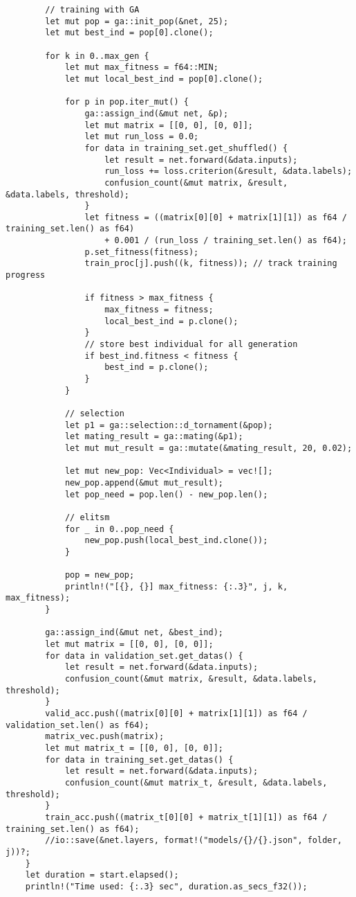 \begin{code}
\begin{verbatim}
        // training with GA
        let mut pop = ga::init_pop(&net, 25);
        let mut best_ind = pop[0].clone();

        for k in 0..max_gen {
            let mut max_fitness = f64::MIN;
            let mut local_best_ind = pop[0].clone();

            for p in pop.iter_mut() {
                ga::assign_ind(&mut net, &p);
                let mut matrix = [[0, 0], [0, 0]];
                let mut run_loss = 0.0;
                for data in training_set.get_shuffled() {
                    let result = net.forward(&data.inputs);
                    run_loss += loss.criterion(&result, &data.labels);
                    confusion_count(&mut matrix, &result, &data.labels, threshold);
                }
                let fitness = ((matrix[0][0] + matrix[1][1]) as f64 / training_set.len() as f64)
                    + 0.001 / (run_loss / training_set.len() as f64);
                p.set_fitness(fitness);
                train_proc[j].push((k, fitness)); // track training progress

                if fitness > max_fitness {
                    max_fitness = fitness;
                    local_best_ind = p.clone();
                }
                // store best individual for all generation
                if best_ind.fitness < fitness {
                    best_ind = p.clone();
                }
            }

            // selection
            let p1 = ga::selection::d_tornament(&pop);
            let mating_result = ga::mating(&p1);
            let mut mut_result = ga::mutate(&mating_result, 20, 0.02);

            let mut new_pop: Vec<Individual> = vec![];
            new_pop.append(&mut mut_result);
            let pop_need = pop.len() - new_pop.len();

            // elitsm
            for _ in 0..pop_need {
                new_pop.push(local_best_ind.clone());
            }

            pop = new_pop;
            println!("[{}, {}] max_fitness: {:.3}", j, k, max_fitness);
        }

        ga::assign_ind(&mut net, &best_ind);
        let mut matrix = [[0, 0], [0, 0]];
        for data in validation_set.get_datas() {
            let result = net.forward(&data.inputs);
            confusion_count(&mut matrix, &result, &data.labels, threshold);
        }
        valid_acc.push((matrix[0][0] + matrix[1][1]) as f64 / validation_set.len() as f64);
        matrix_vec.push(matrix);
        let mut matrix_t = [[0, 0], [0, 0]];
        for data in training_set.get_datas() {
            let result = net.forward(&data.inputs);
            confusion_count(&mut matrix_t, &result, &data.labels, threshold);
        }
        train_acc.push((matrix_t[0][0] + matrix_t[1][1]) as f64 / training_set.len() as f64);
        //io::save(&net.layers, format!("models/{}/{}.json", folder, j))?;
    }
    let duration = start.elapsed();
    println!("Time used: {:.3} sec", duration.as_secs_f32());


\end{verbatim}
\end{code}
